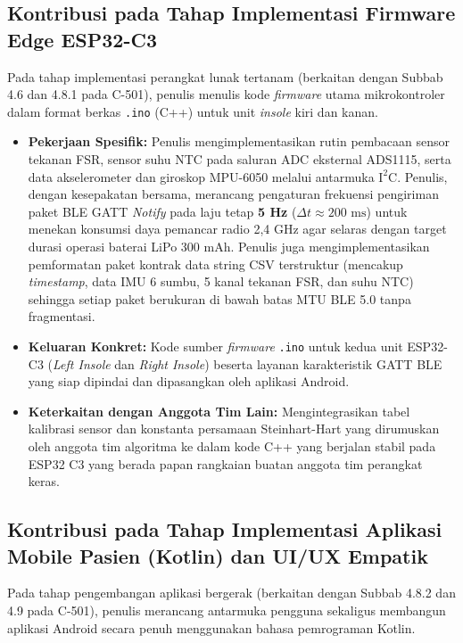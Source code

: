 \subsection{Kontribusi pada Tahap Implementasi Firmware Edge ESP32-C3}
\label{subsec:kontribusi_tahap2}

Pada tahap implementasi perangkat lunak tertanam (berkaitan dengan Subbab 4.6 dan 4.8.1 pada C-501), penulis menulis kode \textit{firmware} utama mikrokontroler dalam format berkas \texttt{.ino} (C++) untuk unit \textit{insole} kiri dan kanan.

\begin{itemize}
    \item \textbf{Pekerjaan Spesifik:} Penulis mengimplementasikan rutin pembacaan sensor tekanan FSR, sensor suhu NTC pada saluran ADC eksternal ADS1115, serta data akselerometer dan giroskop MPU-6050 melalui antarmuka $\text{I}^2\text{C}$. Penulis, dengan kesepakatan bersama, merancang pengaturan frekuensi pengiriman paket BLE GATT \textit{Notify} pada laju tetap \textbf{5 Hz} ($\Delta t \approx 200\text{ ms}$) untuk menekan konsumsi daya pemancar radio 2,4 GHz agar selaras dengan target durasi operasi baterai LiPo 300 mAh. Penulis juga mengimplementasikan pemformatan paket kontrak data string CSV terstruktur (mencakup \textit{timestamp}, data IMU 6 sumbu, 5 kanal tekanan FSR, dan suhu NTC) sehingga setiap paket berukuran di bawah batas MTU BLE 5.0 tanpa fragmentasi.
    \item \textbf{Keluaran Konkret:} Kode sumber \textit{firmware} \texttt{.ino} untuk kedua unit ESP32-C3 (\textit{Left Insole} dan \textit{Right Insole}) beserta layanan karakteristik GATT BLE yang siap dipindai dan dipasangkan oleh aplikasi Android.
    \item \textbf{Keterkaitan dengan Anggota Tim Lain:} Mengintegrasikan tabel kalibrasi sensor dan konstanta persamaan Steinhart-Hart yang dirumuskan oleh anggota tim algoritma ke dalam kode C++ yang berjalan stabil pada ESP32 C3 yang berada papan rangkaian buatan anggota tim perangkat keras.
\end{itemize}

\subsection{Kontribusi pada Tahap Implementasi Aplikasi Mobile Pasien (Kotlin) dan UI/UX Empatik}
\label{subsec:kontribusi_tahap3}

Pada tahap pengembangan aplikasi bergerak (berkaitan dengan Subbab 4.8.2 dan 4.9 pada C-501), penulis merancang antarmuka pengguna sekaligus membangun aplikasi Android secara penuh menggunakan bahasa pemrograman Kotlin.

